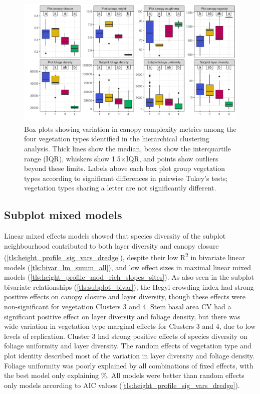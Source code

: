 \begin{refsection}
\begin{figure}
	\includegraphics[width=\linewidth]{img/canopy_metric_box}
	\caption[Boxplots of canopy complexity metrics]{Box plots showing variation in canopy complexity metrics among the four vegetation types identified in the hierarchical clustering analysis. Thick lines show the median, boxes show the interquartile range (IQR), whiskers show 1.5$\times$IQR, and points show outliers beyond these limits. Labels above each box plot group vegetation types according to significant differences in pairwise Tukey's tests; vegetation types sharing a letter are not significantly different.}
	\label{tls:canopy_metric_box}
\end{figure}

\subsection{Subplot mixed models}
\label{tls:ssec:subplot_models}

Linear mixed effects models showed that species diversity of the subplot neighbourhood contributed to both layer diversity and canopy closure (\autoref{tls:height_profile_sig_vars_dredge}), despite their low R\textsuperscript{2} in bivariate linear models (\autoref{tls:bivar_lm_summ_all}), and low effect sizes in maximal linear mixed models (\autoref{tls:height_profile_mod_rich_slopes_sites}). As also seen in the subplot bivariate relationships (\autoref{tls:subplot_bivar}), the Hegyi crowding index had strong positive effects on canopy closure and layer diversity, though these effects were non-significant for vegetation Clusters 3 and 4. Stem basal area CV had a significant positive effect on layer diversity and foliage density, but there was wide variation in vegetation type marginal effects for Clusters 3 and 4, due to low levels of replication. Cluster 3 had strong positive effects of species diversity on foliage uniformity and layer diversity. The random effects of vegetation type and plot identity described most of the variation in layer diversity and foliage density. Foliage uniformity was poorly explained by all combinations of fixed effects, with the best model only explaining \bestUnifRsqS\%. All models were better than random effects only models according to AIC values (\autoref{tls:height_profile_sig_vars_dredge}).


\end{refsection}
